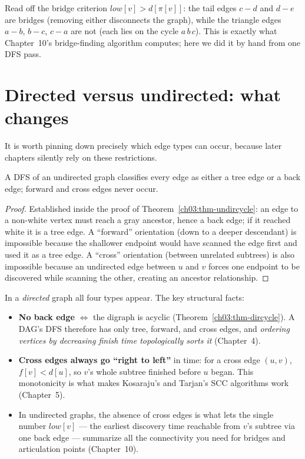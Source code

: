 Read off the bridge criterion $\mathit{low}[v]>d[\pi[v]]$: the tail edges $c-d$ and $d-e$ are bridges (removing either disconnects the graph), while the triangle edges $a-b$, $b-c$, $c-a$ are not (each lies on the cycle $a\,b\,c$). This is exactly what Chapter~10's bridge-finding algorithm computes; here we did it by hand from one DFS pass.

\section{Directed versus undirected: what changes}
\label{ch03:dir-vs-undir}

It is worth pinning down precisely which edge types can occur, because later chapters silently rely on these restrictions.

\begin{proposition}\label{ch03:prop-undir-edges}
A DFS of an undirected graph classifies every edge as either a tree edge or a back edge; forward and cross edges never occur.
\end{proposition}

\begin{proof}
Established inside the proof of Theorem~\ref{ch03:thm-undircycle}: an edge to a non-white vertex must reach a gray ancestor, hence a back edge; if it reached white it is a tree edge. A ``forward'' orientation (down to a deeper descendant) is impossible because the shallower endpoint would have scanned the edge first and used it as a tree edge. A ``cross'' orientation (between unrelated subtrees) is also impossible because an undirected edge between $u$ and $v$ forces one endpoint to be discovered while scanning the other, creating an ancestor relationship.
\end{proof}

In a \emph{directed} graph all four types appear. The key structural facts:

\begin{itemize}
  \item \textbf{No back edge} $\iff$ the digraph is acyclic (Theorem~\ref{ch03:thm-dircycle}). A DAG's DFS therefore has only tree, forward, and cross edges, and \emph{ordering vertices by decreasing finish time topologically sorts it} (Chapter~4).
  \item \textbf{Cross edges always go ``right to left''} in time: for a cross edge $(u,v)$, $f[v]<d[u]$, so $v$'s whole subtree finished before $u$ began. This monotonicity is what makes Kosaraju's and Tarjan's SCC algorithms work (Chapter~5).
  \item In undirected graphs, the absence of cross edges is what lets the single number $\mathit{low}[v]$ --- the earliest discovery time reachable from $v$'s subtree via one back edge --- summarize all the connectivity you need for bridges and articulation points (Chapter~10).
\end{itemize}

